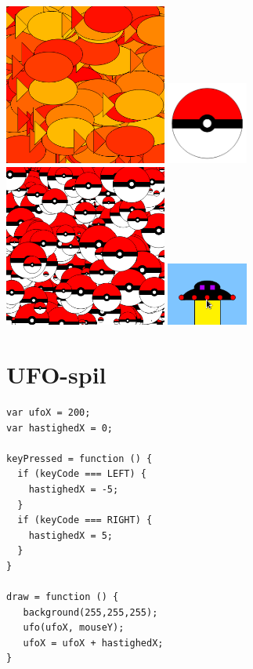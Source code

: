 \documentclass[oneside,a4paper,10pts,article]{memoir}
\begin{document}
\hspace{-20mm}
\includegraphics[width=0.4\textwidth]{pics/flerefisk.png}
\includegraphics[width=0.2\textwidth]{pics/pokeball.png}
\includegraphics[width=0.4\textwidth]{pics/pokeballs.png}
\includegraphics[width=0.2\textwidth]{pics/ufo.png}

\newpage
\chapter{UFO-spil}
\begin{lstlisting}
var ufoX = 200;
var hastighedX = 0;

keyPressed = function () {
  if (keyCode === LEFT) {
    hastighedX = -5;
  }
  if (keyCode === RIGHT) {
    hastighedX = 5;
  }
}

draw = function () {
   background(255,255,255);
   ufo(ufoX, mouseY);
   ufoX = ufoX + hastighedX;
}
\end{lstlisting}
\end{document}
